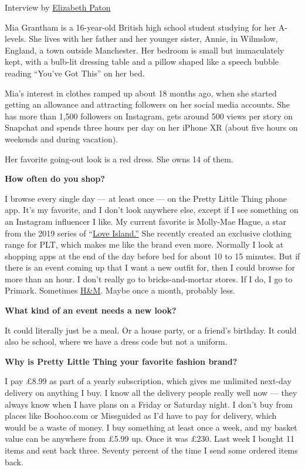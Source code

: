 Interview by \href{https://www.nytimes.com/by/elizabeth-paton}{Elizabeth
Paton}

Mia Grantham is a 16-year-old British high school student studying for
her A-levels. She lives with her father and her younger sister, Annie,
in Wilmslow, England, a town outside Manchester. Her bedroom is small
but immaculately kept, with a bulb-lit dressing table and a pillow
shaped like a speech bubble reading ``You've Got This'' on her bed.

Mia's interest in clothes ramped up about 18 months ago, when she
started getting an allowance and attracting followers on her social
media accounts. She has more than 1,500 followers on Instagram, gets
around 500 views per story on Snapchat and spends three hours per day on
her iPhone XR (about five hours on weekends and during vacation).

Her favorite going-out look is a red dress. She owns 14 of them.

\textbf{How often do you shop?}

I browse every single day --- at least once --- on the Pretty Little
Thing phone app. It's my favorite, and I don't look anywhere else,
except if I see something on an Instagram influencer I like. My current
favorite is Molly-Mae Hague, a star from the 2019 series of
``\href{https://www.nytimes.com/2018/07/26/opinion/sunday/love-island-sex-britain.html}{Love
Island.''} She recently created an exclusive clothing range for PLT,
which makes me like the brand even more. Normally I look at shopping
apps at the end of the day before bed for about 10 to 15 minutes. But if
there is an event coming up that I want a new outfit for, then I could
browse for more than an hour. I don't really go to bricks-and-mortar
stores. If I do, I go to Primark. Sometimes
\href{https://www.nytimes.com/2018/03/27/business/hm-clothes-stock-sales.html}{H\&M}.
Maybe once a month, probably less.

\textbf{What kind of an event needs a new look?}

It could literally just be a meal. Or a house party, or a friend's
birthday. It could also be school, where we have a dress code but not a
uniform.

\textbf{Why is Pretty Little Thing your favorite fashion brand?}

I pay £8.99 as part of a yearly subscription, which gives me unlimited
next-day delivery on anything I buy. I know all the delivery people
really well now --- they always know when I have plans on a Friday or
Saturday night. I don't buy from places like Boohoo.com or Missguided as
I'd have to pay for delivery, which would be a waste of money. I buy
something at least once a week, and my basket value can be anywhere from
£5.99 up. Once it was £230. Last week I bought 11 items and sent back
three. Seventy percent of the time I send some ordered items back.

